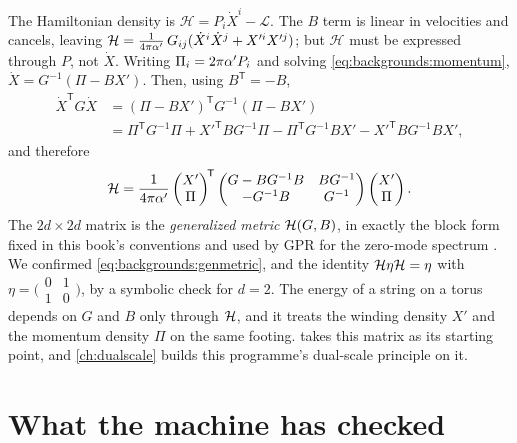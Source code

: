 The Hamiltonian density is $\mathcal H=P_i\dot X^i-\mathcal L$. The $B$ term is linear in
velocities and cancels, leaving
$\mathcal H=\frac{1}{4\pi\alpha'}\,G_{ij}(\dot X^i\dot X^j+X'^iX'^j)$; but $\mathcal H$ must be
expressed through $P$, not $\dot X$. Writing $\Pi_i=2\pi\alpha' P_i$ and solving
\eqref{eq:backgrounds:momentum}, $\dot X=G^{-1}(\Pi-BX')$. Then, using $B^{\mathsf T}=-B$,
\begin{align*}
  \dot X^{\mathsf T}G\dot X&=(\Pi-BX')^{\mathsf T}G^{-1}(\Pi-BX')\\
  &=\Pi^{\mathsf T}G^{-1}\Pi+X'^{\mathsf T}BG^{-1}\Pi-\Pi^{\mathsf T}G^{-1}BX'
    -X'^{\mathsf T}BG^{-1}BX',
\end{align*}
and therefore
\begin{equation}\label{eq:backgrounds:genmetric}
  \mathcal H=\frac{1}{4\pi\alpha'}
  \begin{pmatrix}X'\\ \Pi\end{pmatrix}^{\!\mathsf T}
  \begin{pmatrix}G-BG^{-1}B & BG^{-1}\\ -G^{-1}B & G^{-1}\end{pmatrix}
  \begin{pmatrix}X'\\ \Pi\end{pmatrix}.
\end{equation}
The $2d\times2d$ matrix is the \emph{generalized metric}
$\mathcal{H}(G,B)$, in exactly the block form fixed in this book's conventions and used by GPR for
the zero-mode spectrum . We confirmed \eqref{eq:backgrounds:genmetric}, and the identity
$\mathcal{H}\eta\mathcal{H}=\eta$ with $\eta=\bigl(\begin{smallmatrix}0&1\\1&0\end{smallmatrix}\bigr)$, by a
symbolic check for $d=2$. The energy of a string on a torus depends on $G$ and $B$ only
through $\mathcal{H}$, and it treats the winding density $X'$ and the momentum density $\Pi$ on the
same footing.  takes this matrix as its starting point, and
\cref{ch:dualscale} builds this programme's dual-scale principle on it.

\section{What the machine has checked}\label{sec:backgrounds:lean}


